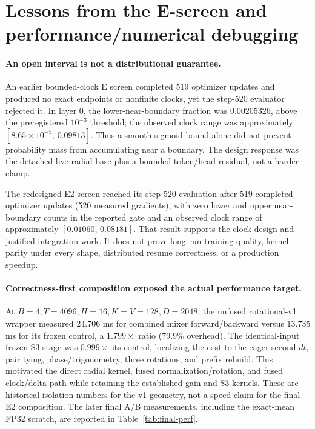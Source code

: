 \documentclass[11pt]{article}
\begin{document}
\section{Lessons from the E-screen and performance/numerical debugging}
\label{sec:lessons}

\paragraph{An open interval is not a distributional guarantee.}
An earlier bounded-clock E screen completed 519 optimizer updates and produced no exact endpoints or
nonfinite clocks, yet the step-520 evaluator rejected it.  In layer 0, the lower-near-boundary
fraction was $0.00205326$, above the preregistered $10^{-3}$ threshold; the observed clock range was
approximately $[8.65\times10^{-5},\,0.09813]$.  Thus a smooth sigmoid bound alone did not prevent
probability mass from accumulating near a boundary.  The design response was the detached live
radial base plus a bounded token/head residual, not a harder clamp.

The redesigned E2 screen reached its step-520 evaluation after 519 completed optimizer updates
(520 measured gradients), with zero lower and upper near-boundary counts in the reported gate and
an observed clock range of approximately
$[0.01060,\,0.08181]$.  That result supports the clock design and justified integration work.  It
does not prove long-run training quality, kernel parity under every shape, distributed resume
correctness, or a production speedup.

\paragraph{Correctness-first composition exposed the actual performance target.}
At $B=4,T=4096,H=16,K=V=128,D=2048$, the unfused rotational-v1 wrapper measured 24.706 ms for
combined mixer forward/backward versus 13.735 ms for its frozen control, a $1.799\times$ ratio
(79.9\% overhead).  The identical-input frozen S3 stage was $0.999\times$ its control, localizing
the cost to the eager second-$dt$, pair tying, phase/trigonometry, three rotations, and prefix
rebuild.  This motivated the direct radial kernel, fused normalization/rotation, and fused
clock/delta path while retaining the established gain and S3 kernels.  These are historical
isolation numbers for the v1 geometry, not a speed claim for the final E2 composition.  The later
final A/B measurements, including the exact-mean FP32 scratch, are reported in
Table~\ref{tab:final-perf}.
\end{document}
